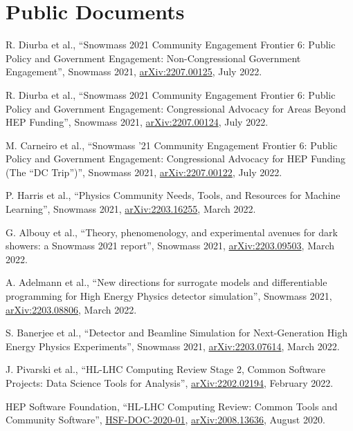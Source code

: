 \section{Public Documents}
\begin{description}[leftmargin=12pt,font=\normalfont,labelsep=0em]
\item R. Diurba et al., ``Snowmass 2021 Community Engagement Frontier 6: Public Policy and Government Engagement: Non-Congressional Government Engagement'', Snowmass 2021, \href{https://arxiv.org/abs/2207.00125}{arXiv:2207.00125}, July 2022.
\item R. Diurba et al., ``Snowmass 2021 Community Engagement Frontier 6: Public Policy and Government Engagement: Congressional Advocacy for Areas Beyond HEP Funding'', Snowmass 2021, \href{https://arxiv.org/abs/2207.00124}{arXiv:2207.00124}, July 2022.
\item M. Carneiro et al., ``Snowmass '21 Community Engagement Frontier 6: Public Policy and Government Engagement: Congressional Advocacy for HEP Funding (The ``DC Trip'')'', Snowmass 2021, \href{https://arxiv.org/abs/2207.00122}{arXiv:2207.00122}, July 2022.
\item P. Harris et al., ``Physics Community Needs, Tools, and Resources for Machine Learning'', Snowmass 2021, \href{https://arxiv.org/abs/2203.16255}{arXiv:2203.16255}, March 2022.
\item G. Albouy et al., ``Theory, phenomenology, and experimental avenues for dark showers: a Snowmass 2021 report'', Snowmass 2021, \href{https://arxiv.org/abs/2203.09503}{arXiv:2203.09503}, March 2022.
\item A. Adelmann et al., ``New directions for surrogate models and differentiable programming for High Energy Physics detector simulation'', Snowmass 2021, \href{https://arxiv.org/abs/2203.08806}{arXiv:2203.08806}, March 2022.
\item S. Banerjee et al., ``Detector and Beamline Simulation for Next-Generation High Energy Physics Experiments'', Snowmass 2021, \href{https://arxiv.org/abs/2203.07614}{arXiv:2203.07614}, March 2022.
\item J. Pivarski et al., ``HL-LHC Computing Review Stage 2, Common Software Projects: Data Science Tools for Analysis'', \href{https://arxiv.org/abs/2202.02194}{arXiv:2202.02194}, February 2022.
\item HEP Software Foundation, ``HL-LHC Computing Review: Common Tools and Community Software'', \href{https://dx.doi.org/10.5281/zenodo.4009114}{HSF-DOC-2020-01}, \href{https://arxiv.org/abs/2008.13636}{arXiv:2008.13636}, August 2020.

\end{description}

